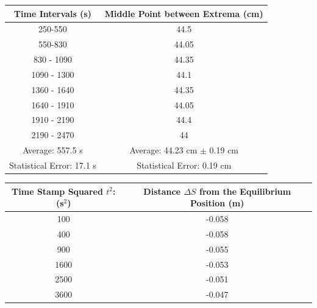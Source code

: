\documentclass{article}
\begin{document}
\begin{center}
        \centering
        \begin{tabular}{|c |c |}
            \hline
        Time Intervals (s) & Middle Point between Extrema (cm) \\
\hline     \hline
            250-550 & 44.5\\
            \hline
            550-830 & 44.05\\
            \hline
            830 - 1090 &44.35\\
                            \hline
            1090 - 1300 &44.1\\
                            \hline
            1360 - 1640 & 44.35\\
                            \hline
            1640 - 1910 & 44.05 \\
                            \hline
            1910 - 2190 &44.4\\
                            \hline
            2190 - 2470 &44 \\
            \hline
             Average: 557.5 s & Average: 44.23 cm $\pm$ 0.19 cm\\
            \hline
            Statistical Error: 17.1 s   & Statistical Error: 0.19 cm\\
            \hline
        \end{tabular}
        \label{tab:my_label}
\end{center}



            

\begin{center}
        \centering
        \begin{tabular}{|c |c |}
            \hline
        Time Stamp Squared $t^2$:  (s$^2$) & Distance $\Delta S$ from the Equilibrium Position (m) \\
\hline     \hline
            100 & -0.058\\
            \hline
            400 & -0.058\\
            \hline
            900 & -0.055\\
             \hline
            1600 & -0.053 \\
            \hline
            2500 & -0.051 \\
            \hline
            3600 &  -0.047\\
            \hline
        \end{tabular}
        \label{tab:my_label}
\end{center}
\end{document}
